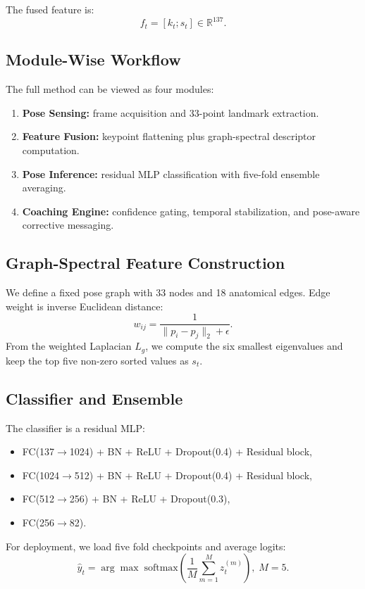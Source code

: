 \documentclass[conference]{IEEEtran}
\begin{document}
The fused feature is:
\begin{equation}
f_t = [k_t ; s_t] \in \mathbb{R}^{137}.
\end{equation}

\subsection{Module-Wise Workflow}
The full method can be viewed as four modules:
\begin{enumerate}
\item \textbf{Pose Sensing:} frame acquisition and 33-point landmark extraction.
\item \textbf{Feature Fusion:} keypoint flattening plus graph-spectral descriptor computation.
\item \textbf{Pose Inference:} residual MLP classification with five-fold ensemble averaging.
\item \textbf{Coaching Engine:} confidence gating, temporal stabilization, and pose-aware corrective messaging.
\end{enumerate}

\subsection{Graph-Spectral Feature Construction}
We define a fixed pose graph with 33 nodes and 18 anatomical edges. Edge weight is inverse Euclidean distance:
\begin{equation}
w_{ij} = \frac{1}{\|p_i - p_j\|_2 + \epsilon}.
\end{equation}
From the weighted Laplacian $L_g$, we compute the six smallest eigenvalues and keep the top five non-zero sorted values as $s_t$.

\subsection{Classifier and Ensemble}
The classifier is a residual MLP:
\begin{itemize}
\item FC(137$\rightarrow$1024) + BN + ReLU + Dropout(0.4) + Residual block,
\item FC(1024$\rightarrow$512) + BN + ReLU + Dropout(0.4) + Residual block,
\item FC(512$\rightarrow$256) + BN + ReLU + Dropout(0.3),
\item FC(256$\rightarrow$82).
\end{itemize}

For deployment, we load five fold checkpoints and average logits:
\begin{equation}
\hat{y}_t = \arg\max \; \text{softmax}\left(\frac{1}{M}\sum_{m=1}^{M} z_t^{(m)}\right), \; M=5.
\end{equation}
\end{document}
